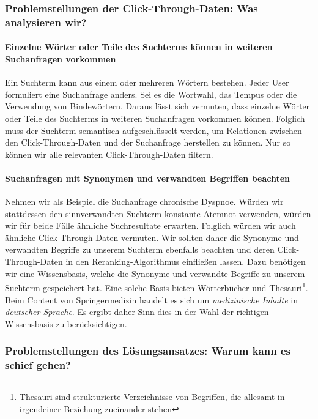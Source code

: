 \subsubsection{Problemstellungen der Click-Through-Daten: Was analysieren wir?}
\label{sec:Grundlagen:Grundbegriffe:SemantikUserInteraktionen:ProblemstellungenClick-Through-Daten}

\paragraph{Einzelne Wörter oder Teile des Suchterms können in weiteren Suchanfragen vorkommen}
Ein Suchterm kann aus einem oder mehreren Wörtern bestehen. Jeder User formuliert eine Suchanfrage anders. Sei es die Wortwahl, das Tempus oder die Verwendung von Bindewörtern. Daraus lässt sich vermuten, dass einzelne Wörter oder Teile des Suchterms in weiteren Suchanfragen vorkommen können. Folglich muss der Suchterm semantisch aufgeschlüsselt werden, um Relationen zwischen den Click-Through-Daten und der Suchanfrage herstellen zu können. Nur so können wir alle relevanten Click-Through-Daten filtern.

\pagebreak

\paragraph{Suchanfragen mit Synonymen und verwandten Begriffen beachten}
Nehmen wir als Beispiel die Suchanfrage \glqq chronische Dyspnoe\grqq{}. Würden wir stattdessen den sinnverwandten Suchterm \glqq konstante Atemnot\grqq{} verwenden, würden wir für beide Fälle ähnliche Suchresultate erwarten. Folglich würden wir auch ähnliche Click-Through-Daten vermuten. Wir sollten daher die Synonyme und verwandten Begriffe zu unserem Suchterm ebenfalls beachten und deren Click-Through-Daten in den Reranking-Algorithmus einfließen lassen. Dazu benötigen wir eine Wissensbasis, welche die Synonyme und verwandte Begriffe zu unserem Suchterm gespeichert hat. Eine solche Basis bieten Wörterbücher und Thesauri\footnote{Thesauri sind strukturierte Verzeichnisse von Begriffen, die allesamt in irgendeiner Beziehung zueinander stehen}. Beim Content von Springermedizin handelt es sich um \textit{medizinische Inhalte} in \textit{deutscher Sprache}. Es ergibt daher Sinn dies in der Wahl der richtigen Wissensbasis zu berücksichtigen.

\subsubsection{Problemstellungen des Lösungsansatzes: Warum kann es schief gehen?}
\label{sec:Grundlagen:Grundbegriffe:SemantikUserInteraktionen:ProblemstellungenLoesungsansatz} 

